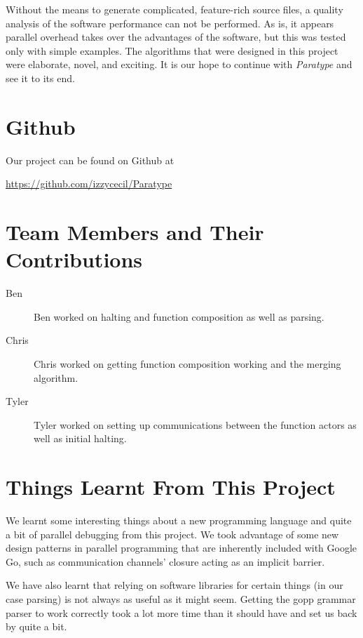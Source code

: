 \documentclass{acm_proc_article-sp}
\begin{document}
Without the means to generate complicated, feature-rich source files, a quality
analysis of the software performance can not be performed. As is, it appears
parallel overhead takes over the advantages of the software, but this was
tested only with simple examples. The algorithms that were designed in this
project were elaborate, novel, and exciting. It is our hope to continue with
\emph{Paratype} and see it to its end.

\appendix

\section{Github}

Our project can be found on Github at
\begin{center}
	\vspace{-5mm}
	\url{https://github.com/izzycecil/Paratype}
\end{center}

\section{Team Members and Their Contributions}
	\begin{description}
		\item[Ben] Ben worked on halting and function composition as well as
			parsing.
		\item[Chris] Chris worked on getting function composition working and
			the merging algorithm. 
		\item[Tyler] Tyler worked on setting up communications between the
			function actors as well as initial halting.
	\end{description}

\section{Things Learnt From This Project}

	We learnt some interesting things about a new programming language and
	quite a bit of parallel debugging from this project. We took advantage of
	some new design patterns in parallel programming that are inherently
	included with Google Go, such as communication channels' closure acting as
	an implicit barrier.

	We have also learnt that relying on software libraries for certain things
	(in our case parsing) is not always as useful as it might seem. Getting the
	gopp grammar parser to work correctly took a lot more time than it should
	have and set us back by quite a bit.
\end{document}
